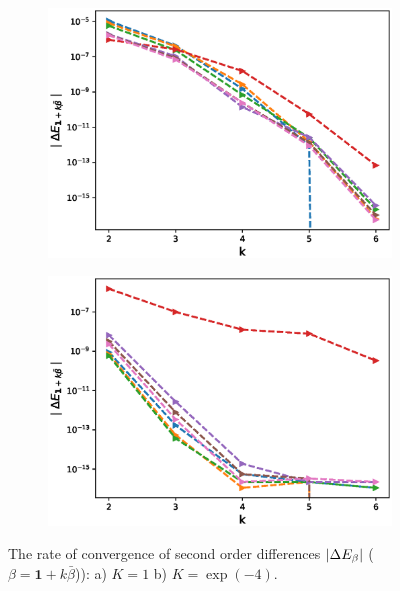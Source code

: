 \documentclass[11pt]{article}
\begin{document}
\begin{figure}[h!]
	\centering
	\begin{subfigure}{.5\textwidth}
		\centering
		\includegraphics[width=1\linewidth]{./figures/mixed_diff_second_way/H_007/N_8/mixed_difference_order2_rbergomi_8steps_H_007_K_1.eps}
		\caption{}
		\label{fig:sub3}
	\end{subfigure}%
	\begin{subfigure}{.5\textwidth}
		\centering
		\includegraphics[width=1\linewidth]{./figures/mixed_diff_second_way/H_007/N_8/mixed_difference_order2_rbergomi_8steps_H_007_K_exp__4.eps}
		\caption{}
		\label{fig:sub4}
	\end{subfigure}
	
	\caption{The rate of convergence of  second order differences $\left\lvert\Delta E_{\beta}\right\rvert$ ($\beta=\mathbf{1}+k \bar{\beta}$)): a) $K=1$ b)  $K=\operatorname{exp}(-4).$}
	\label{fig:test2}
\end{figure}
\end{document}
